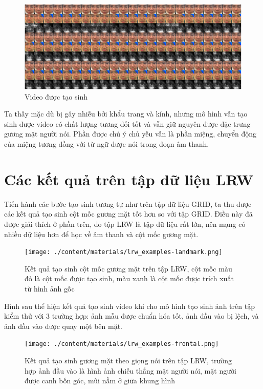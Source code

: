 \begin{figure}[H]
    \centering
    \includegraphics[width=16cm]{./content/materials/khang_gen.png}
    \caption{Video được tạo sinh}
\end{figure}

Ta thấy mặc dù bị gây nhiễu bởi khẩu trang và kính, nhưng mô hình vẫn tạo sinh được video có chất lượng tương đối tốt và vẫn giữ nguyên được đặc trưng gương mặt người nói. Phần được chú ý chủ yếu vẫn là phần miệng, chuyển động của miệng tương đồng với từ ngữ được nói trong đoạn âm thanh.

\section{Các kết quả trên tập dữ liệu LRW}
Tiến hành các bước tạo sinh tương tự như trên tập dữ liệu GRID, ta thu được các kết quả tạo sinh cột mốc gương mặt tốt hơn so với tập GRID. Điều này đã được giải thích ở phần trên, do tập LRW là tập dữ liệu rất lớn, nên mạng có nhiều dữ liệu hơn để học về âm thanh và cột mốc gương mặt.

\begin{figure}[H]
    \centering
    \texttt{[image: ./content/materials/lrw\_examples-landmark.png]}
    \caption{Kết quả tạo sinh cột mốc gương mặt trên tập LRW, cột mốc màu đỏ là cột mốc được tạo sinh, màu xanh là cột mốc được trích xuất từ hình ảnh gốc}
\end{figure}

Hình sau thể hiện kết quả tạo sinh video khi cho mô hình tạo sinh ảnh trên tập kiểm thử với 3 trường hợp: ảnh mẫu được chuẩn hóa tốt, ảnh đầu vào bị lệch, và ảnh đầu vào được quay một bên mặt.

\begin{figure}[H]
    \centering
    \texttt{[image: ./content/materials/lrw\_examples-frontal.png]}
    \caption{Kết quả tạo sinh gương mặt theo giọng nói trên tập LRW, trường hợp ảnh đầu vào là hình ảnh chiếu thẳng mặt người nói, mặt người được canh bốn góc, mũi nằm ở giữa khung hình}
\end{figure}

